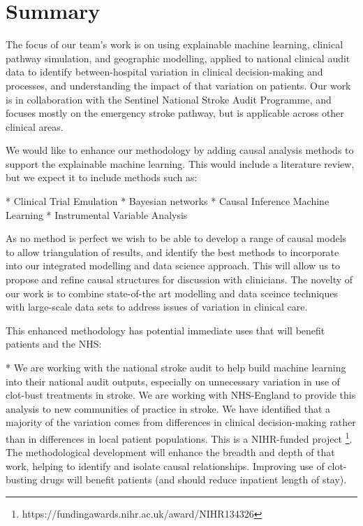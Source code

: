 \section*{Summary}


The focus of our team's work is on using explainable machine learning, clinical pathway simulation, and geographic modelling, applied to national clinical audit data to identify between-hospital variation in clinical decision-making and processes, and understanding the impact of that variation on patients. Our work is in collaboration with the Sentinel National Stroke Audit Programme, and focuses mostly on the emergency stroke pathway, but is applicable across other clinical areas.

We would like to enhance our methodology by adding causal analysis methods to support the explainable machine learning. This would include a literature review, but we expect it to include methods such as:

\begin{markdown}
* Clinical Trial Emulation
* Bayesian networks
* Causal Inference Machine Learning
* Instrumental Variable Analysis
\end{markdown}

As no method is perfect we wish to be able to develop a range of causal models to allow triangulation of results, and identify the best methods to incorporate into our integrated modelling and data science approach. This will allow us to propose and refine causal structures for discussion with clinicians. The novelty of our work is to combine state-of-the art modelling and data sceince techniques with large-scale data sets to address issues of variation in clinical care.

This enhanced methodology has potential immediate uses that will benefit patients and the NHS:

* We are working with the national stroke audit to help build machine learning into their national audit outputs, especially on unnecessary variation in use of clot-bust treatments in stroke. We are working with NHS-England to provide this analysis to new communities of practice in stroke. We have identified that a majority of the variation comes from differences in clinical decision-making rather than in differences in local patient populations. This is a NIHR-funded project \footnote{https://fundingawards.nihr.ac.uk/award/NIHR134326}. The methodological development will enhance the breadth and depth of that work, helping to identify and isolate causal relationships. Improving use of clot-busting drugs will benefit patients (and should reduce inpatient length of stay).

